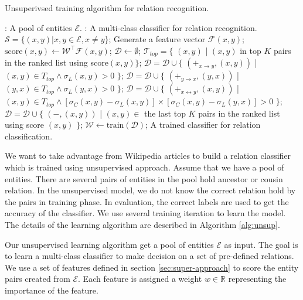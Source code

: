 \begin{algorithm*}[!htb]
  
  \caption{Unsuperivsed training algorithm for relation recognition.}
  \begin{algorithmic}[1]
    : A pool of entities $\mathcal{E}$.
    : A multi-class classifier for relation recognition.
    \STATE
    \STATE $\mathcal{S} = \{ (x,y) | x, y \in \mathcal{E}, x \neq y \}$;
    \STATE Generate a feature vector $\mathcal{F}(x,y)$;
    \ENDFOR
    \STATE $\text{score}(x,y) \leftarrow \mathcal{W}^\top \mathcal{F}(x,y)$;
    \ENDFOR
    \STATE $\mathcal{D} \leftarrow \emptyset$;
    \STATE $\mathcal{T}_{top} = \{$ $(x,y)$ | $(x,y)$ in top $K$ pairs in the ranked list using score$(x,y) \}$;
    \STATE $\mathcal{D} = \mathcal{D} \cup \{$ $(+_{x \rightarrow y}, (x,y))$ | $(x,y) \in T_{top} \wedge \sigma_L(x,y) > 0$ $\}$;
    \STATE $\mathcal{D} = \mathcal{D} \cup \{$ $(+_{y \rightarrow x}, (y,x))$ | $(y,x) \in T_{top} \wedge \sigma_L(y,x) > 0$ $\}$;
    \STATE $\mathcal{D} = \mathcal{D} \cup \{$ $(+_{x \leftrightarrow y}, (x,y))$ | $(x,y) \in T_{top} \wedge [\sigma_C(x,y)-\sigma_L(x,y)] \times [\sigma_C(x,y)-\sigma_L(y,x)] > 0$ $\}$;
    \STATE $\mathcal{D} = \mathcal{D} \cup \{$ $(-, (x,y))$ | $(x,y) \in$ the last top $K$ pairs in the ranked list using score $(x,y)$ $\}$;
    \ENDFOR
    \STATE $\mathcal{W} \leftarrow \text{train}(\mathcal{D})$;
    \ENDWHILE
    \RETURN A trained classifier for relation classification.
  \end{algorithmic}
  \label{alg:unsup}
\end{algorithm*}

We want to take advantage from Wikipedia articles to build a relation
classifier which is trained using unsupervised approach. Assume that
we have a pool of entities. There are several pairs of entities in the
pool hold ancestor or cousin relation. In the unsupervised model, we
do not know the correct relation hold by the pairs in training
phase. In evaluation, the correct labels are used to get the accuracy
of the classifier. We use several training iteration to learn the
model. The details of the learning algorithm are described in
Algorithm \ref{alg:unsup}.

Our unsupervised learning algorithm get a pool of entities
$\mathcal{E}$ as input. The goal is to learn a multi-class classifier
to make decision on a set of pre-defined relations. We use a set of
features defined in section \ref{sec:super-approach} to score the
entity pairs created from $\mathcal{E}$. Each feature is assigned a
weight $w \in \mathbb{R}$ representing the importance of the feature.

